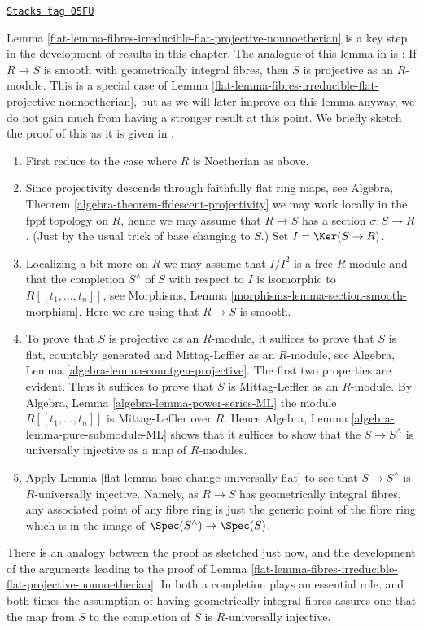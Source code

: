\begin{remark}[How in RG]
\label{flat-remark-how-in-RG}
\href{https://stacks.math.columbia.edu/tag/05FU}{\texttt{Stacks tag 05FU}}

Lemma \ref{flat-lemma-fibres-irreducible-flat-projective-nonnoetherian}
is a key step in the development of results in this chapter. The analogue
of this lemma in \cite{GruRay} is \cite[I Proposition 3.3.1]{GruRay}:
If $R \to S$ is smooth with geometrically integral fibres, then $S$
is projective as an $R$-module. This is a special case of
Lemma \ref{flat-lemma-fibres-irreducible-flat-projective-nonnoetherian},
but as we will later improve on this lemma anyway, we do not gain much
from having a stronger result at this point.
We briefly sketch the proof of this as it is given in \cite{GruRay}.
\begin{enumerate}
\item First reduce to the case where $R$ is Noetherian as above.
\item Since projectivity descends through faithfully flat ring maps, see
Algebra, Theorem \ref{algebra-theorem-ffdescent-projectivity}
we may work locally in the fppf topology on $R$, hence we may assume
that $R \to S$ has a section $\sigma : S \to R$. (Just by the usual trick of
base changing to $S$.) Set $I = \Ker(S \to R)$.
\item Localizing a bit more on $R$ we may assume that $I/I^2$ is a free
$R$-module and that the completion $S^\wedge$ of $S$ with respect to $I$
is isomorphic to $R[[t_1, \ldots, t_n]]$, see
Morphisms, Lemma \ref{morphisms-lemma-section-smooth-morphism}.
Here we are using that $R \to S$ is smooth.
\item To prove that $S$ is projective as an $R$-module, it suffices to
prove that $S$ is flat, countably generated and Mittag-Leffler as an
$R$-module, see
Algebra, Lemma \ref{algebra-lemma-countgen-projective}.
The first two properties are evident. Thus it suffices to prove that $S$
is Mittag-Leffler as an $R$-module. By
Algebra, Lemma \ref{algebra-lemma-power-series-ML}
the module $R[[t_1, \ldots, t_n]]$ is Mittag-Leffler over $R$. Hence
Algebra, Lemma \ref{algebra-lemma-pure-submodule-ML}
shows that it suffices to show that the
$S \to S^\wedge$ is universally injective as a map of $R$-modules.
\item Apply
Lemma \ref{flat-lemma-base-change-universally-flat}
to see that $S \to S^\wedge$ is $R$-universally injective.
Namely, as $R \to S$ has geometrically integral fibres, any associated
point of any fibre ring is just the generic point of the fibre ring which
is in the image of $\Spec(S^\wedge) \to \Spec(S)$.
\end{enumerate}
There is an analogy between the proof as sketched just now, and the
development of the arguments leading to the proof of
Lemma \ref{flat-lemma-fibres-irreducible-flat-projective-nonnoetherian}.
In both a completion plays an essential role, and both times the
assumption of having geometrically integral fibres assures one that the
map from $S$ to the completion of $S$ is $R$-universally injective.
\end{remark}

